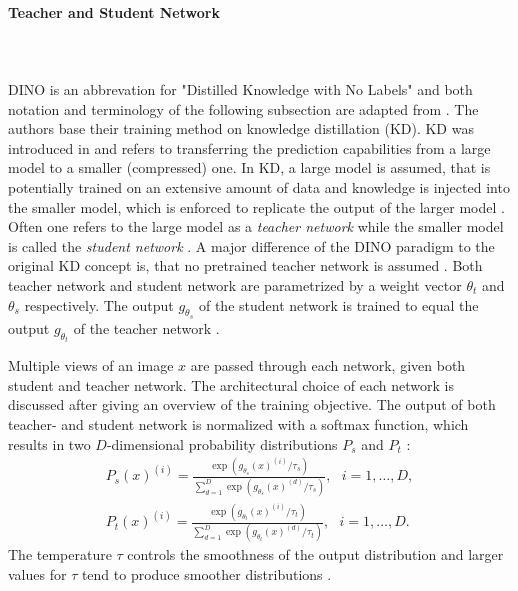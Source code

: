 \paragraph{Teacher and Student Network} \mbox{} \\
\\
DINO is an abbrevation for "Distilled Knowledge with No Labels" and both notation and terminology of the following subsection are adapted from \citep{Caron2021}.
The authors base their training method on knowledge distillation (KD).
KD was introduced in \citep{Hinton2015} and refers to transferring the prediction capabilities from a large model to a smaller (compressed) one.
In KD, a large model is assumed, that is potentially trained on an extensive amount of data and knowledge is injected into the smaller model, which is enforced to replicate the output of the larger model \citep{Hinton2015,Caron2021}.
Often one refers to the large model as a \textit{teacher network} while the smaller model is called the \textit{student network} \citep{Caron2021}. 
A major difference of the DINO paradigm to the original KD concept is, that no pretrained teacher network is assumed \citep{Caron2021}.
Both teacher network and student network are parametrized by a weight vector $\theta_t$ and $\theta_s$ respectively.
The output $g_{\theta_s}$ of the student network is trained to equal the output $g_{\theta_t}$ of the teacher network \citep{Caron2021}.
\par
Multiple views of an image $x$ are passed through each network, given both student and teacher network.
The architectural choice of each network is discussed after giving an overview of the training objective.
The output of both teacher- and student network is normalized with a softmax function, which results in two $D$-dimensional probability distributions $P_s$ and $P_t$ \citep{Caron2021}:
\begin{align}
	P_{s}(x)^{(i)} = \frac{\exp(g_{\theta_{s}}(x)^{(i)}/\tau_{s})}{\sum_{d=1}^{D}\exp(g_{\theta_{s}}(x)^{(d)}/\tau_{s})}, \hspace{8pt} i=1,\dots,D, \\
	P_{t}(x)^{(i)} = \frac{\exp(g_{\theta_{t}}(x)^{(i)}/\tau_{t})}{\sum_{d=1}^{D}\exp(g_{\theta_{t}}(x)^{(d)}/\tau_{t})}, \hspace{8pt} i=1,\dots,D.
	\label{equation:dino-softmax}
\end{align}
The temperature $\tau$ controls the smoothness of the output distribution \citep{Caron2021} and larger values for $\tau$ tend to produce smoother distributions \citep{Hinton2015}.
